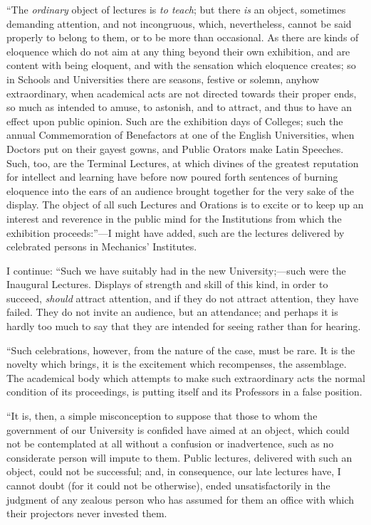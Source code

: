 ``The \emph{ordinary} object of lectures is \emph{to teach};
but there \emph{is} an object, sometimes demanding attention, and not
incongruous, which, nevertheless, cannot be said properly to belong to
them, or to be more than occasional. As there are kinds of eloquence
which do not aim at any thing beyond their own exhibition, and are
content with being eloquent, and with the sensation which eloquence
creates; so in Schools and Universities there are seasons, festive or
solemn, anyhow extraordinary, when academical acts are not directed
towards their proper ends, so much as intended to amuse, to astonish,
and to attract, and thus to have an effect upon public opinion. Such
are the exhibition days of Colleges; such the annual Commemoration of
Benefactors at one of the English Universities, when Doctors put
on their gayest gowns, and Public Orators make Latin Speeches. Such,
too, are the Terminal Lectures, at which divines of the greatest
reputation for intellect and learning have before now poured forth
sentences of burning eloquence into the ears of an audience brought
together for the very sake of the display. The object of all such
Lectures and Orations is to excite or to keep up an interest and
reverence in the public mind for the Institutions from which the
exhibition proceeds:''—I might have added, such are the lectures
delivered by celebrated persons in Mechanics' Institutes.

I continue: ``Such we have suitably had in the new University;—such
were the Inaugural Lectures. Displays of strength and skill of this
kind, in order to succeed, \emph{should} attract attention, and if
they do not attract attention, they have failed. They do not invite an
audience, but an attendance; and perhaps it is hardly too much to say
that they are intended for seeing rather than for hearing.

``Such celebrations, however, from the nature of the case, must
be rare. It is the novelty which brings, it is the excitement which
recompenses, the assemblage. The academical body which attempts to
make such extraordinary acts the normal condition of its proceedings,
is putting itself and its Professors in a false position.

``It is, then, a simple misconception to suppose that those to
whom the government of our University is confided have aimed at an
object, which could not be contemplated at all without a confusion or
inadvertence, such as no considerate person will impute to them.
Public lectures, delivered with such an object, could not be
successful; and, in consequence, our late lectures have, I cannot
doubt (for it could not be otherwise), ended unsatisfactorily in
the judgment of any zealous person who has assumed for them an office
with which their projectors never invested them.

